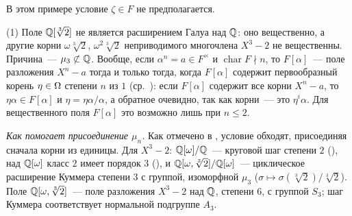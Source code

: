 \begin{example}
В этом примере условие $\zeta\in F$ не предполагается.

(1) Поле $\mathbb Q[\sqrt[3]2]$ не является расширением Галуа над $\mathbb Q$: оно вещественно, а другие корни $\omega\sqrt[3]2$,
$\omega^2\sqrt[3]2$ неприводимого многочлена $X^3-2$ не вещественны. Причина~--- $\mu_3\not\subset\mathbb Q$. Вообще, если
$\alpha^n=a\in F^\times$ и $\operatorname{char}F\nmid n$, то $F[\alpha]$~--- поле разложения $X^n-a$ тогда и только тогда,
когда $F[\alpha]$ содержит первообразный корень $\eta\in\Omega$ степени $n$ из $1$ (ср.\ ): если $F[\alpha]$ содержит
все корни $X^n-a$, то $\eta\alpha\in F[\alpha]$ и $\eta=\eta\alpha/\alpha$, а обратное очевидно, так как корни~--- это
$\eta^i\alpha$. Для вещественного поля $F[\alpha]$ это возможно лишь при $n\le2$.

\emph{Как помогает присоединение $\mu_n$.} Как отмечено в , условие обходят, присоединяя сначала корни из единицы.
Для $X^3-2$: $\mathbb Q[\omega]/\mathbb Q$~--- круговой шаг степени $2$ (), над $\mathbb Q[\omega]$ класс $2$ имеет порядок $3$ (), и
$\mathbb Q[\omega,\sqrt[3]2]/\mathbb Q[\omega]$~--- циклическое расширение Куммера степени $3$ с группой, изоморфной $\mu_3$
($\sigma\mapsto\sigma(\sqrt[3]2)/\sqrt[3]2$). Поле $\mathbb Q[\omega,\sqrt[3]2]$~--- поле разложения $X^3-2$ над $\mathbb Q$, степени $6$,
с группой $S_3$; шаг Куммера соответствует нормальной подгруппе $A_3$.
\begin{keepfig}
\begin{center}
\end{center}
\end{keepfig}


\end{example}
